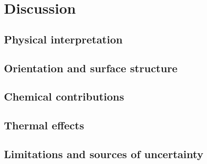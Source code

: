 \chapter{Discussion}

\section{Physical interpretation}
\section{Orientation and surface structure}
\section{Chemical contributions}
\section{Thermal effects}
\section{Limitations and sources of uncertainty}